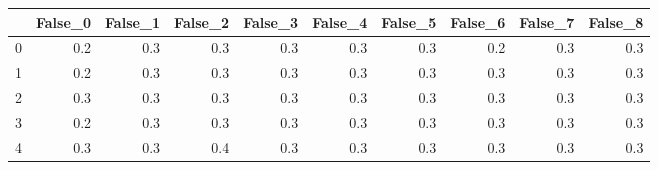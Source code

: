 \begin{tabular}{lrrrrrrrrr}
\toprule
{} &  False\_0 &  False\_1 &  False\_2 &  False\_3 &  False\_4 &  False\_5 &  False\_6 &  False\_7 &  False\_8 \\ \hline
\midrule
0 &      0.2 &      0.3 &      0.3 &      0.3 &      0.3 &      0.3 &      0.2 &      0.3 &      0.3 \\ \hline
1 &      0.2 &      0.3 &      0.3 &      0.3 &      0.3 &      0.3 &      0.3 &      0.3 &      0.3 \\ \hline
2 &      0.3 &      0.3 &      0.3 &      0.3 &      0.3 &      0.3 &      0.3 &      0.3 &      0.3 \\ \hline
3 &      0.2 &      0.3 &      0.3 &      0.3 &      0.3 &      0.3 &      0.3 &      0.3 &      0.3 \\ \hline
4 &      0.3 &      0.3 &      0.4 &      0.3 &      0.3 &      0.3 &      0.3 &      0.3 &      0.3 \\ \hline
\bottomrule
\end{tabular}
